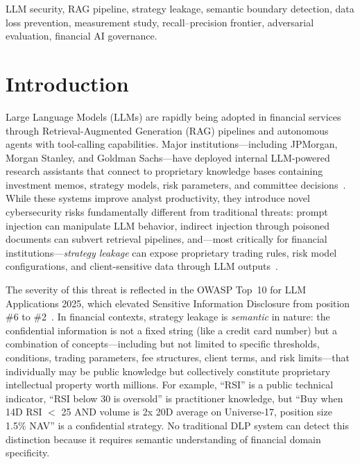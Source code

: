 \documentclass[journal]{IEEEtran}
\begin{document}
\begin{IEEEkeywords}
LLM security, RAG pipeline, strategy leakage, semantic boundary detection,
data loss prevention, measurement study, recall--precision frontier,
adversarial evaluation, financial AI governance.
\end{IEEEkeywords}

\IEEEpeerreviewmaketitle

\section{Introduction}
\label{Sect:Introduction}

Large Language Models (LLMs) are rapidly being adopted in financial services through Retrieval-Augmented Generation (RAG) pipelines and autonomous agents with tool-calling capabilities. Major institutions---including JPMorgan, Morgan Stanley, and Goldman Sachs---have deployed internal LLM-powered research assistants that connect to proprietary knowledge bases containing investment memos, strategy models, risk parameters, and committee decisions~\cite{wsj_jpmorgan_ai, bloomberg_ms_ai, ft_gs_ai}. While these systems improve analyst productivity, they introduce novel cybersecurity risks fundamentally different from traditional threats: prompt injection can manipulate LLM behavior, indirect injection through poisoned documents can subvert retrieval pipelines, and---most critically for financial institutions---\textit{strategy leakage} can expose proprietary trading rules, risk model configurations, and client-sensitive data through LLM outputs~\cite{owasp_llm_2025}.

The severity of this threat is reflected in the OWASP Top~10 for LLM Applications 2025, which elevated Sensitive Information Disclosure from position \#6 to \#2~\cite{owasp_llm_2025}. In financial contexts, strategy leakage is \textit{semantic} in nature: the confidential information is not a fixed string (like a credit card number) but a combination of concepts---including but not limited to specific thresholds, conditions, trading parameters, fee structures, client terms, and risk limits---that individually may be public knowledge but collectively constitute proprietary intellectual property worth millions. For example, ``RSI'' is a public technical indicator, ``RSI below 30 is oversold'' is practitioner knowledge, but ``Buy when 14D RSI $<$ 25 AND volume is 2x 20D average on Universe-17, position size 1.5\% NAV'' is a confidential strategy. No traditional DLP system can detect this distinction because it requires semantic understanding of financial domain specificity.
\end{document}
